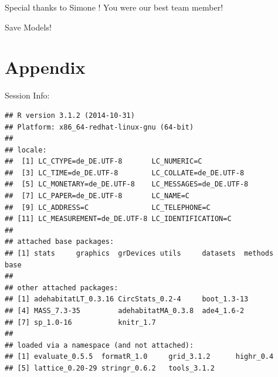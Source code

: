 \documentclass[11pt, a4paper]{article}\usepackage[]{graphicx}\usepackage[]{color}
\makeatletter
\newenvironment{kframe}{%
 \def\at@end@of@kframe{}%
 \ifinner\ifhmode%
  \def\at@end@of@kframe{\end{minipage}}%
  \begin{minipage}{\columnwidth}%
 \fi\fi%
 \def\FrameCommand##1{\hskip\@totalleftmargin \hskip-\fboxsep
 \colorbox{shadecolor}{##1}\hskip-\fboxsep
     \hskip-\linewidth \hskip-\@totalleftmargin \hskip\columnwidth}%
 \MakeFramed {\advance\hsize-\width
   \@totalleftmargin\z@ \linewidth\hsize
   \@setminipage}}%
 {\par\unskip\endMakeFramed%
 \at@end@of@kframe}
\newenvironment{knitrout}{}{} %
\makeatother
\begin{document}
Special thanks to   Simone  ! You were our best team member! 

Save Models!

\section{Appendix}

Session Info:
\begin{knitrout}
\color{fgcolor}\begin{kframe}
\begin{verbatim}
## R version 3.1.2 (2014-10-31)
## Platform: x86_64-redhat-linux-gnu (64-bit)
## 
## locale:
##  [1] LC_CTYPE=de_DE.UTF-8       LC_NUMERIC=C              
##  [3] LC_TIME=de_DE.UTF-8        LC_COLLATE=de_DE.UTF-8    
##  [5] LC_MONETARY=de_DE.UTF-8    LC_MESSAGES=de_DE.UTF-8   
##  [7] LC_PAPER=de_DE.UTF-8       LC_NAME=C                 
##  [9] LC_ADDRESS=C               LC_TELEPHONE=C            
## [11] LC_MEASUREMENT=de_DE.UTF-8 LC_IDENTIFICATION=C       
## 
## attached base packages:
## [1] stats     graphics  grDevices utils     datasets  methods   base     
## 
## other attached packages:
## [1] adehabitatLT_0.3.16 CircStats_0.2-4     boot_1.3-13        
## [4] MASS_7.3-35         adehabitatMA_0.3.8  ade4_1.6-2         
## [7] sp_1.0-16           knitr_1.7          
## 
## loaded via a namespace (and not attached):
## [1] evaluate_0.5.5  formatR_1.0     grid_3.1.2      highr_0.4      
## [5] lattice_0.20-29 stringr_0.6.2   tools_3.1.2
\end{verbatim}
\end{kframe}
\end{knitrout}

{}

\end{document}
